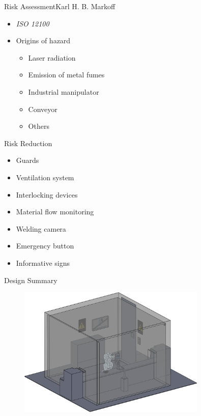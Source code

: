 
\begin{frame}{Risk Assessment}{Karl H. B. Markoff}
\begin{itemize}
    \item \textit{ISO 12100}
    \item Origins of hazard
        \begin{itemize}
            \item Laser radiation
            \item Emission of metal fumes
            \item Industrial manipulator
            \item Conveyor 
            \item Others
        \end{itemize}
    \end{itemize}
\end{frame}

\begin{frame}{Risk Reduction}
\begin{itemize}
    \item Guards
    \item Ventilation system
    \item Interlocking devices
    \item Material flow monitoring
    \item Welding camera
    \item Emergency button
    \item Informative signs
\end{itemize}
\end{frame}

\begin{frame}{Design Summary}
\begin{figure}
\centering
\includegraphics[width=0.8\textwidth]{graphics/hugo/workc}
\end{figure}
\end{frame}


